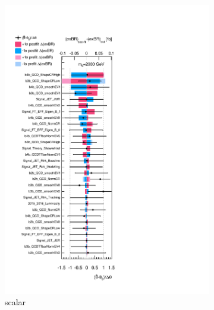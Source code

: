 \begin{figure}[htb!]
\centering
\captionsetup{justification=centering}
    \begin{subfigure}[b]{0.31\textwidth}
        \includegraphics[width=\textwidth]{figures/boosted/results/ranking_okt18_s_2000.pdf}
        \caption{scalar}
        \label{fig:ranking2000-s}
    \end{subfigure}
    \quad 
    \begin{subfigure}[b]{0.31\textwidth}

\end{subfigure}
\end{figure}
